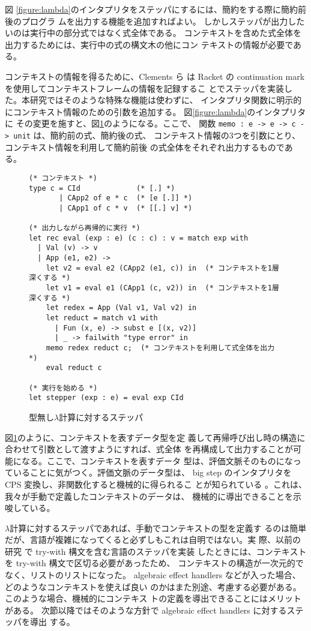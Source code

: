 図 \ref{figure:lambda}のインタプリタをステッパにするには、簡約をする際に簡約前後のプログラ
ムを出力する機能を追加すればよい。
しかしステッパが出力したいのは実行中の部分式ではなく式全体である。
コンテキストを含めた式全体を出力するためには、実行中の式の構文木の他にコン
テキストの情報が必要である。

コンテキストの情報を得るために、Clements ら\cite{clements01} は Racket
の continuation mark を使用してコンテキストフレームの情報を記録するこ
とでステッパを実装した。本研究ではそのような特殊な機能は使わずに、
インタプリタ関数に明示的にコンテキスト情報のための引数を追加する。
図\ref{figure:lambda}のインタプリタに
その変更を施すと、図\ref{figure:lambda_stepper}のようになる。ここで、
関数 \texttt{memo :\ e -> e -> c -> unit} は、簡約前の式、簡約後の式、
コンテキスト情報の3つを引数にとり、コンテキスト情報を利用して簡約前後
の式全体をそれぞれ出力するものである。

\begin{figure}
\begin{spacing}{0.9} 
\begin{verbatim}
(* コンテキスト *)
type c = CId             (* [.] *)
       | CApp2 of e * c  (* [e [.]] *)
       | CApp1 of c * v  (* [[.] v] *)

(* 出力しながら再帰的に実行 *)
let rec eval (exp : e) (c : c) : v = match exp with
  | Val (v) -> v
  | App (e1, e2) ->
    let v2 = eval e2 (CApp2 (e1, c)) in  (* コンテキストを1層深くする *)
    let v1 = eval e1 (CApp1 (c, v2)) in  (* コンテキストを1層深くする *)
    let redex = App (Val v1, Val v2) in
    let reduct = match v1 with
      | Fun (x, e) -> subst e [(x, v2)]
      | _ -> failwith "type error" in
    memo redex reduct c;  (* コンテキストを利用して式全体を出力 *)
    eval reduct c

(* 実行を始める *)
let stepper (exp : e) = eval exp CId
\end{verbatim}
\caption{型無し$\lambda$計算に対するステッパ}
\label{figure:lambda_stepper}
\end{spacing}
\end{figure}

図\ref{figure:lambda_stepper}のように、コンテキストを表すデータ型を定
義して再帰呼び出し時の構造に合わせて引数として渡すようにすれば、式全体
を再構成して出力することが可能になる。ここで、コンテキストを表すデータ
型は、評価文脈そのものになっていることに気がつく。評価文脈のデータ型は、
big step のインタプリタを CPS 変換し、非関数化すると機械的に得られるこ
とが知られている \cite{AK2010, 10.1145/1411204.1411206}。これは、我々が手動で定義したコンテキストのデータは、
機械的に導出できることを示唆している。

$\lambda$計算に対するステッパであれば、手動でコンテキストの型を定義す
るのは簡単だが、言語が複雑になってくると必ずしもこれは自明ではない。実
際、以前の研究 \cite{FCA19} で try-with 構文を含む言語のステッパを実装
したときには、コンテキストを try-with 構文で区切る必要があったため、
コンテキストの構造が一次元的でなく、リストのリストになった。
algebraic effect handlers などが入った場合、どのようなコンテキストを使えば良い
のかはまた別途、考慮する必要がある。このような場合、機械的にコンテキス
トの定義を導出できることにはメリットがある。
次節以降ではそのような方針で algebraic effect handlers に対するステッパを導出
する。
